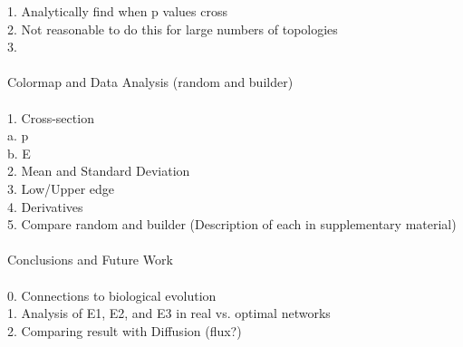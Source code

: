 \documentclass{amsart}
\theoremstyle{plain}
\numberwithin{equation}{section}
\begin{document}
1. Analytically find when p values cross\\
2. Not reasonable to do this for large numbers of topologies\\
3. \\
\\
Colormap and Data Analysis (random and builder)\\
\\
1. Cross-section\\
 a. p\\
 b. E\\
2. Mean and Standard Deviation\\
3. Low/Upper edge\\
4. Derivatives\\
5. Compare random and builder (Description of each in supplementary material)\\
\\
Conclusions and Future Work\\
\\
0. Connections to biological evolution\\
1. Analysis of E1, E2, and E3 in real vs. optimal networks\\
2. Comparing result with Diffusion (flux?)\\
\\
\end{document}
